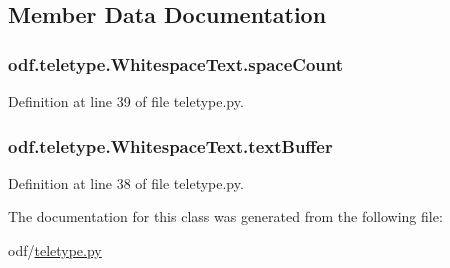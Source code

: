 \subsection{Member Data Documentation}
\hypertarget{classodf_1_1teletype_1_1WhitespaceText_a3917a28f107445a8c7284a466e9d498b}{
\subsubsection[{space\+Count}]{\setlength{\rightskip}{0pt plus 5cm}odf.\+teletype.\+Whitespace\+Text.\+space\+Count}}\label{classodf_1_1teletype_1_1WhitespaceText_a3917a28f107445a8c7284a466e9d498b}


Definition at line 39 of file teletype.\+py.

\hypertarget{classodf_1_1teletype_1_1WhitespaceText_acbf9abb2ff5e2abe625a158e09566571}{
\subsubsection[{text\+Buffer}]{\setlength{\rightskip}{0pt plus 5cm}odf.\+teletype.\+Whitespace\+Text.\+text\+Buffer}}\label{classodf_1_1teletype_1_1WhitespaceText_acbf9abb2ff5e2abe625a158e09566571}


Definition at line 38 of file teletype.\+py.



The documentation for this class was generated from the following file\+:\begin{DoxyCompactItemize}
\item 
odf/\hyperlink{teletype_8py}{teletype.\+py}\end{DoxyCompactItemize}
